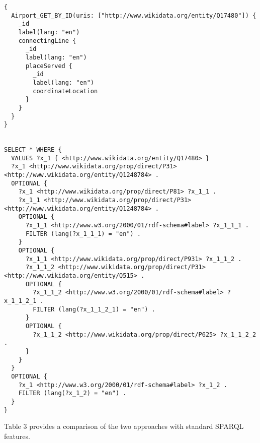 \begin{minipage}{\linewidth}
\begin{lstlisting}[label=listing:listing44, caption={Query 4 - HyperGraphQL}]
{
  Airport_GET_BY_ID(uris: ["http://www.wikidata.org/entity/Q17480"]) {
    _id
    label(lang: "en")
    connectingLine {
      _id
      label(lang: "en")
      placeServed {
        _id
        label(lang: "en")
        coordinateLocation
      }
    }
  }
} 


SELECT * WHERE {
  VALUES ?x_1 { <http://www.wikidata.org/entity/Q17480> }
  ?x_1 <http://www.wikidata.org/prop/direct/P31> <http://www.wikidata.org/entity/Q1248784> .
  OPTIONAL {
    ?x_1 <http://www.wikidata.org/prop/direct/P81> ?x_1_1 .
    ?x_1_1 <http://www.wikidata.org/prop/direct/P31> <http://www.wikidata.org/entity/Q1248784> .
    OPTIONAL {
      ?x_1_1 <http://www.w3.org/2000/01/rdf-schema#label> ?x_1_1_1 .
      FILTER (lang(?x_1_1_1) = "en") .
    }
    OPTIONAL {
      ?x_1_1 <http://www.wikidata.org/prop/direct/P931> ?x_1_1_2 .
      ?x_1_1_2 <http://www.wikidata.org/prop/direct/P31> <http://www.wikidata.org/entity/Q515> .
      OPTIONAL {
        ?x_1_1_2 <http://www.w3.org/2000/01/rdf-schema#label> ?x_1_1_2_1 .
        FILTER (lang(?x_1_1_2_1) = "en") .
      }
      OPTIONAL {
        ?x_1_1_2 <http://www.wikidata.org/prop/direct/P625> ?x_1_1_2_2 .
      }
    }
  }
  OPTIONAL {
    ?x_1 <http://www.w3.org/2000/01/rdf-schema#label> ?x_1_2 .
    FILTER (lang(?x_1_2) = "en") .
  }
}

\end{lstlisting}
\end{minipage}


Table 3 provides a comparison of the two approaches with standard SPARQL features.

